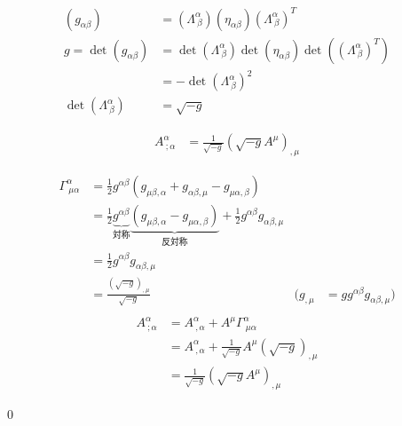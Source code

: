 \documentclass[uplatex,dvipdfmx,a4paper,11pt]{jlreq}
\makeatletter
\theoremstyle{definition}
\renewenvironment{proof}[1][\proofname]{\par
  \normalfont
  \topsep6\p@\@plus6\p@ \trivlist
  \item[\hskip\labelsep{\bfseries #1}\@addpunct{\bfseries}]\ignorespaces\quad\par
}{%
  \qed\endtrivlist\@endpefalse
}
\renewcommand\proofname{証明}
\makeatother
\begin{document}
\begin{align}
  (g_{\alpha\beta})              & = (\Lambda^\alpha_{\ \beta})(\eta_{\alpha\beta})(\Lambda^\alpha_{\ \beta})^T               \\
  g = \det(g_{\alpha\beta})      & = \det(\Lambda^\alpha_{\ \beta})\det(\eta_{\alpha\beta})\det((\Lambda^\alpha_{\ \beta})^T) \\
                                 & = -\det(\Lambda^\alpha_{\ \beta})^2                                                        \\
  \det(\Lambda^\alpha_{\ \beta}) & = \sqrt{-g}
\end{align}
\begin{theorem}[発散の公式]
  \begin{align}
    A^\alpha_{\ ;\alpha} & = \frac{1}{\sqrt{-g}}(\sqrt{-g}A^\mu)_{,\mu}
  \end{align}
\end{theorem}
\begin{proof}
  \begin{align}
    \Gamma^\alpha_{\ \mu\alpha} & = \frac{1}{2}g^{\alpha\beta}(g_{\mu\beta,\alpha} + g_{\alpha\beta,\mu} - g_{\mu\alpha,\beta})                                                                                                                     \\
                                & = \frac{1}{2}\underbrace{g^{\alpha\beta}}_{対称}\underbrace{(g_{\mu\beta,\alpha} - g_{\mu\alpha,\beta})}_{反対称} + \frac{1}{2}g^{\alpha\beta}g_{\alpha\beta,\mu}                                                      \\
                                & = \frac{1}{2}g^{\alpha\beta}g_{\alpha\beta,\mu}                                                                                                                                                                   \\
                                & = \frac{(\sqrt{-g})_{,\mu}}{\sqrt{-g}}                                                                                                                       & (g_{,\mu} & = gg^{\alpha\beta}g_{\alpha\beta,\mu}) \\
  \end{align}
  \begin{align}
    A^\alpha_{\ ;\alpha} & = A^\alpha_{\ ,\alpha} + A^\mu\Gamma^\alpha_{\ \mu\alpha}           \\
                         & = A^\alpha_{\ ,\alpha} + \frac{1}{\sqrt{-g}}A^\mu(\sqrt{-g})_{,\mu} \\
                         & = \frac{1}{\sqrt{-g}}(\sqrt{-g}A^\mu)_{,\mu}
  \end{align}

\end{proof}
\end{document}
